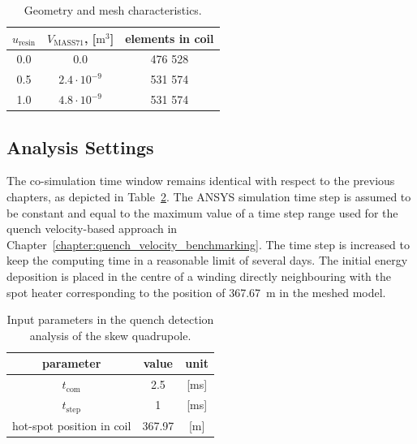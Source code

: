 \begin{table}[H]
    \caption{Geometry and mesh characteristics.} 
    \vspace{-1.em} 
    \fontsize{10}{10}
    \selectfont 
    \renewcommand{\arraystretch}{1.5}
    \begin{center}
        \begin{tabular}{ c | c | c }  
        \hline
        $u_\text{resin}$ & $V_\text{MASS71}$, [$\text{m}^3$] & elements in coil \\
        \hline
        0.0 & 0.0 & 476 528 \\
        0.5 & $2.4 \cdot 10^{-9}$ & 531 574 \\
        1.0 & $4.8 \cdot 10^{-9}$ & 531 574 \\
        \hline 
        \end{tabular}
    \end{center}  
     \label{table: skew_quad_geometry_cases} 
 \end{table}

\subsection{Analysis Settings}

The co-simulation time window remains identical with respect to the previous chapters, as depicted in Table~\ref{table: skew_quad_quench_detect_input_params}. The ANSYS simulation time step is assumed to be constant and equal to the maximum value of a time step range used for the quench velocity-based approach in Chapter~\ref{chapter:quench_velocity_benchmarking}. The time step is increased to keep the computing time in a reasonable limit of several days. The initial energy deposition is placed in the centre of a winding directly neighbouring with the spot heater corresponding to the position of 367.67~m in the meshed model.

\begin{table}[H]
    \caption{Input parameters in the quench detection analysis of the skew quadrupole.} 
    \vspace{-1.em} 
    \fontsize{10}{10}
    \selectfont 
    \renewcommand{\arraystretch}{1.5}
    \begin{center}
        \begin{tabular}{ ccc }  
        \hline
        parameter & value & unit \\
        \hline
        $t_\text{com}$ & 2.5 & [ms] \\
        $t_\text{step}$ & 1 & [ms] \\ 
        hot-spot position in coil & 367.97 & [m] \\
        \hline 
        \end{tabular}
    \end{center}  
     \label{table: skew_quad_quench_detect_input_params} 
 \end{table}

